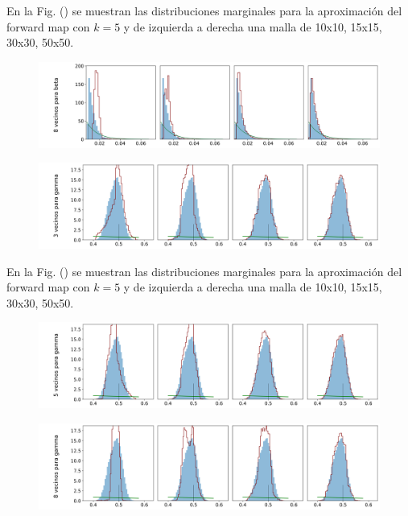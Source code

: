 En la Fig. () se muestran las distribuciones marginales para la aproximación del forward map con $k = 5$ y de izquierda a derecha una malla de 10x10, 15x15, 30x30, 50x50.

\begin{figure}[H] 
    \centering 
    \includegraphics[width = 17 cm ]{img/Exp_Central_SIR_Sigma/Figuras/Generales/Convergencia_theta1_3_SIR_sigma.png} 
\end{figure} 

\begin{figure}[H] 
    \centering 
    \includegraphics[width = 17 cm ]{img/Exp_Central_SIR_Sigma/Figuras/Generales/Convergencia_theta2_1_SIR_sigma.png} 
\end{figure} 

En la Fig. () se muestran las distribuciones marginales para la aproximación del forward map con $k = 5$ y de izquierda a derecha una malla de 10x10, 15x15, 30x30, 50x50.

\begin{figure}[H] 
    \centering 
    \includegraphics[width = 17 cm ]{img/Exp_Central_SIR_Sigma/Figuras/Generales/Convergencia_theta2_2_SIR_sigma.png} 
\end{figure} 

\begin{figure}[H] 
    \centering 
    \includegraphics[width = 17 cm ]{img/Exp_Central_SIR_Sigma/Figuras/Generales/Convergencia_theta2_3_SIR_sigma.png} 
\end{figure} 


